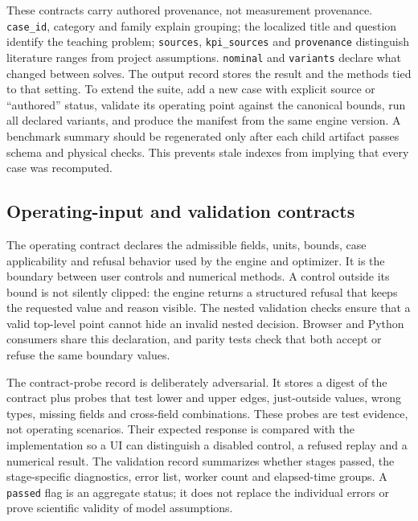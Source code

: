 \documentclass[10pt]{article}
\begin{document}
These contracts carry authored provenance, not measurement provenance.
\texttt{case\_id}, category and family explain grouping; the localized
title and question identify the teaching problem; \texttt{sources},
\texttt{kpi\_sources} and \texttt{provenance} distinguish literature
ranges from project assumptions. \texttt{nominal} and \texttt{variants}
declare what changed between solves. The output record stores the result
and the methods tied to that setting. To extend the suite, add a new
case with explicit source or ``authored'' status, validate its operating
point against the canonical bounds, run all declared variants, and
produce the manifest from the same engine version. A benchmark summary
should be regenerated only after each child artifact passes schema and
physical checks. This prevents stale indexes from implying that every
case was recomputed.

\subsection{Operating-input and validation
contracts}\label{operating-input-and-validation-contracts}

\label{contract-operating-validation}

The operating contract declares the admissible fields, units, bounds,
case applicability and refusal behavior used by the engine and
optimizer. It is the boundary between user controls and numerical
methods. A control outside its bound is not silently clipped: the engine
returns a structured refusal that keeps the requested value and reason
visible. The nested validation checks ensure that a valid top-level
point cannot hide an invalid nested decision. Browser and Python
consumers share this declaration, and parity tests check that both
accept or refuse the same boundary values.

The contract-probe record is deliberately adversarial. It stores a
digest of the contract plus probes that test lower and upper edges,
just-outside values, wrong types, missing fields and cross-field
combinations. These probes are test evidence, not operating scenarios.
Their expected response is compared with the implementation so a UI can
distinguish a disabled control, a refused replay and a numerical result.
The validation record summarizes whether stages passed, the
stage-specific diagnostics, error list, worker count and elapsed-time
groups. A \texttt{passed} flag is an aggregate status; it does not
replace the individual errors or prove scientific validity of model
assumptions.
\end{document}
